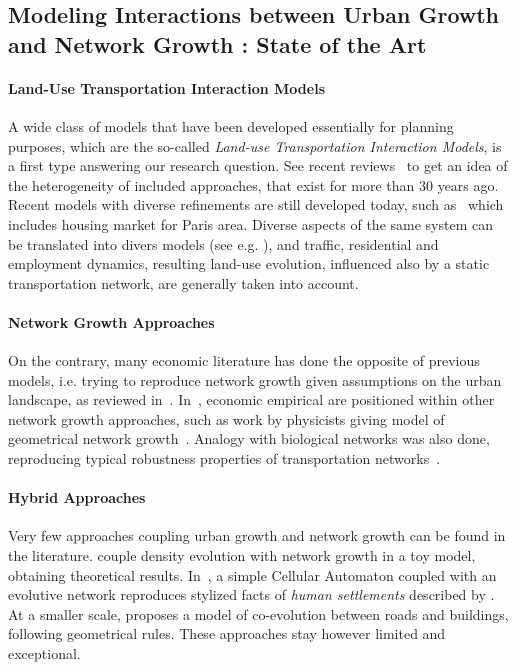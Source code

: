 \subsection{Modeling Interactions between Urban Growth and Network Growth : State of the Art}

\paragraph{Land-Use Transportation Interaction Models}

A wide class of models that have been developed essentially for planning purposes, which are the so-called \emph{Land-use Transportation Interaction Models}, is a first type answering our research question. See recent reviews~\cite{chang2006models,iacono2008models,wegener2004land} to get an idea of the heterogeneity of included approaches, that exist for more than 30 years ago. Recent models with diverse refinements are still developed today, such as~\cite{delons:hal-00319087} which includes housing market for Paris area. Diverse aspects of the same system can be translated into divers models (see e.g. \cite{wegener1991one}), and traffic, residential and employment dynamics, resulting land-use evolution, influenced also by a static transportation network, are generally taken into account.

\paragraph{Network Growth Approaches}
On the contrary, many economic literature has done the opposite of previous models, i.e. trying to reproduce network growth given assumptions on the urban landscape, as reviewed in~\cite{zhang2007economics}. In~\cite{xie2009modeling}, economic empirical are positioned within other network growth approaches, such as work by physicists giving model of geometrical network growth~\cite{barthelemy2008modeling}. Analogy with biological networks was also done, reproducing typical robustness properties of transportation networks~\cite{TeroAl10}.


\paragraph{Hybrid Approaches}

Very few approaches coupling urban growth and network growth can be found in the literature. \cite{barthelemy2009co} couple density evolution with network growth in a toy model, obtaining theoretical results. In~\cite{raimbault2014hybrid}, a simple Cellular Automaton coupled with an evolutive network reproduces stylized facts of \emph{human settlements} described by . At a smaller scale, \cite{achibet2014model} proposes a model of co-evolution between roads and buildings, following geometrical rules. These approaches stay however limited and exceptional.


